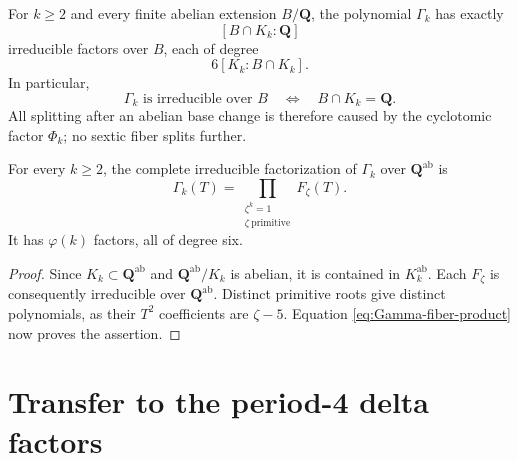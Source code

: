 \begin{theorem}\label{thm:abelian-factorization}
For $k\ge2$ and every finite abelian extension $B/\mathbf Q$, the
polynomial $\Gamma_k$ has exactly
\[
 [B\cap K_k:\mathbf Q]
\]
irreducible factors over $B$, each of degree
\[
 6[K_k:B\cap K_k].
\]
In particular,
\[
 \Gamma_k\text{ is irreducible over }B
 \quad\Longleftrightarrow\quad
 B\cap K_k=\mathbf Q.
\]
All splitting after an abelian base change is therefore caused by the
cyclotomic factor $\Phi_k$; no sextic fiber splits further.
\end{theorem}

\begin{corollary}
\label{cor:Qab-factorization}
For every $k\ge2$, the complete irreducible factorization of $\Gamma_k$
over $\mathbf Q^{\mathrm{ab}}$ is
\begin{equation}\label{eq:Qab-complete-factorization}
 \Gamma_k(T)=
 \prod_{\substack{\zeta^k=1\\ \zeta\ \mathrm{primitive}}}F_\zeta(T).
\end{equation}
It has $\varphi(k)$ factors, all of degree six.
\end{corollary}

\begin{proof}
Since $K_k\subset\mathbf Q^{\mathrm{ab}}$ and
$\mathbf Q^{\mathrm{ab}}/K_k$ is abelian, it is contained in
$K_k^{\mathrm{ab}}$.  Each $F_\zeta$ is consequently irreducible over
$\mathbf Q^{\mathrm{ab}}$.  Distinct primitive roots give distinct
polynomials, as their $T^2$ coefficients are $\zeta-5$.  Equation
\eqref{eq:Gamma-fiber-product} now proves the assertion.
\end{proof}

\section{Transfer to the period-4 delta factors}

